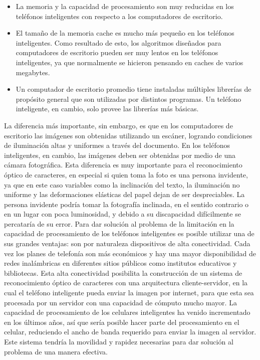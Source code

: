 \documentclass[a4paper, 11pt, oneside]{report}
\begin{document}
\begin{itemize}
\item La memoria y la capacidad de procesamiento son muy reducidas en los teléfonos inteligentes con respecto a los computadores de escritorio.
\item El tamaño de la memoria cache es mucho más pequeño en los teléfonos inteligentes. Como resultado de esto, los algoritmos diseñados para computadores de escritorio pueden ser muy lentos en los teléfonos inteligentes, ya que normalmente se hicieron pensando en caches de varios megabytes.
\item Un computador de escritorio promedio tiene instaladas múltiples librerías de propósito general que son utilizadas por distintos programas. Un teléfono inteligente, en cambio, solo provee las librerías más básicas.
\end{itemize}
La diferencia más importante, sin embargo, es que en los computadores de escritorio las imágenes son obtenidas utilizando un escáner, logrando condiciones de iluminación altas y uniformes a través del documento. En los teléfonos inteligentes, en cambio, las imágenes deben ser obtenidas por medio de una cámara fotográfica. Esta diferencia es muy importante para el reconocimiento óptico de caracteres, en especial si quien toma la foto es una persona invidente, ya que en este caso variables como la inclinación del texto, la iluminación no uniforme y las deformaciones elásticas del papel dejan de ser despreciables. La persona invidente podría tomar la fotografía inclinada, en el sentido contrario o en un lugar con poca luminosidad, y debido a su discapacidad difícilmente se percataría de su error.
Para dar solución al problema de la limitación en la capacidad de procesamiento de los teléfonos inteligentes es posible utilizar una de sus grandes ventajas: son por naturaleza dispositivos de alta conectividad. Cada vez los planes de telefonía son más económicos y hay una mayor disponibilidad de redes inalámbricas en diferentes sitios públicos como institutos educativos y bibliotecas. Esta alta conectividad posibilita la construcción de un sistema de reconocimiento óptico de caracteres con una arquitectura cliente-servidor, en la cual el teléfono inteligente pueda enviar la imagen por internet, para que esta sea procesada por un servidor con una capacidad de cómputo mucho mayor. La capacidad de procesamiento de los celulares inteligentes ha venido incrementado en los últimos años, así que sería posible hacer parte del procesamiento en el celular, reduciendo el ancho de banda requerido para enviar la imagen al servidor. Este sistema tendría la movilidad y rapidez necesarias para dar solución al problema de una manera efectiva.
\end{document}
